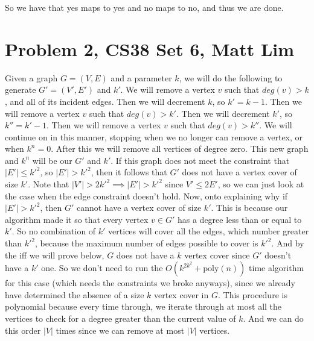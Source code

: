 \documentclass{article}
\begin{document}
So we have that yes maps to yes and no maps to no, and thus we are done.
\newpage

\section*{Problem 2, CS38 Set 6, Matt Lim}
Given a graph $G = (V,E)$ and a parameter $k$, we will do the following to
generate $G' = (V',E')$ and $k'$. We will remove a vertex $v$ such that $deg(v)
> k$, and all of its incident edges. Then we will decrement $k$, so $k' = k -
1$. Then we will remove a vertex $v$ such that $deg(v) > k'$. Then we will
decrement $k'$, so $k'' = k' - 1$. Then we will remove a vertex $v$ such that
$deg(v) > k''$. We will continue on in this manner, stopping when we no longer
can remove a vertex, or when $k^n
= 0$. After this we will remove all vertices of degree zero. This new graph and
$k^n$ will be our $G'$ and $k'$. If this graph does not meet the constraint that
$|E'| \leq k'^2$, so $|E'| > k'^2$, then it follows that $G'$ does not have a
vertex cover of size $k'$. Note that $|V'|
> 2k'^2 \implies |E'| > k'^2$ since $V' \leq 2E'$, so we can just look at the
case when the edge constraint doesn't hold. Now, onto explaining why if $|E'| > k'^2$,
then $G'$ cannot have a vertex cover of size $k'$. This is because our algorithm
made it so that every vertex $v \in G'$ has a degree less than or equal to $k'$. So no
combination of $k'$ vertices will cover all the edges, which number greater than
$k'^2$, because the maximum number of edges possible to cover is $k'^2$. And by the
iff we will prove below, $G$ does not have a $k$ vertex cover since $G'$ doesn't
have a $k'$ one.
So we don't need to run the $O(k^{2k^2} + \text{poly}(n))$ time algorithm for
this case (which needs the constraints we broke anyways), since we already have
determined the absence of a size $k$ vertex cover in $G$. This
procedure is polynomial because every time through, we iterate through at most all the
vertices to check for a degree greater than the current value of $k$. And we can
do this order $|V|$ times since we can remove at most $|V|$ vertices.
\end{document}
